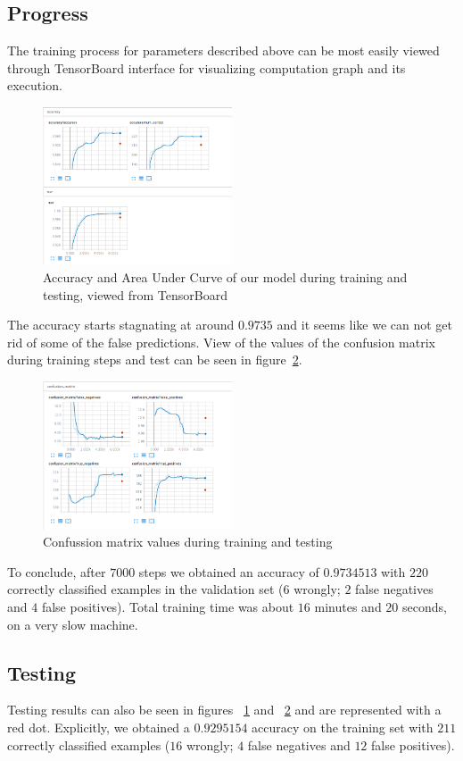 \documentclass[twoside]{article}
\begin{document}
\begin{multicols}{2}
\subsection{Progress}
The training process for parameters described above can be most easily viewed through TensorBoard interface for visualizing computation graph and its execution. 
\begin{figure}[H]
\includegraphics[width=0.5\textwidth]{train-test_acc}
\caption{Accuracy and Area Under Curve of our model during training and testing, viewed from TensorBoard}
\label{fig:accuracy}
\end{figure}

The accuracy starts stagnating at around $0.9735$ and it seems like we can not get rid of some of the false predictions. View of the values of the confusion matrix during training steps and test can be seen in figure~\ref{fig:confmat}.
\begin{figure}[H]
\includegraphics[width=0.5\textwidth]{train-test_cm}
\caption{Confussion matrix values during training and testing}
\label{fig:confmat}
\end{figure}

To conclude, after $7000$ steps we obtained an accuracy of $0.9734513$ with $220$ correctly classified examples in the validation set ($6$ wrongly; $2$ false negatives and $4$ false positives). Total training time was about $16$ minutes and $20$ seconds, on a very slow machine.

\subsection{Testing}
Testing results can also be seen in figures ~\ref{fig:accuracy} and ~\ref{fig:confmat} and are represented with a red dot. Explicitly, we obtained a $0.9295154$ accuracy on the training set with $211$ correctly classified examples ($16$ wrongly; $4$ false negatives and $12$ false positives).


\end{multicols}
\end{document}
